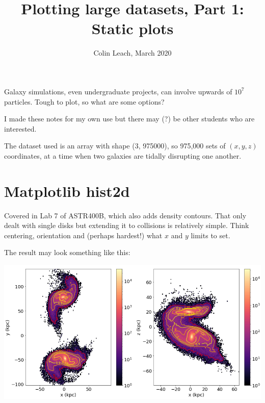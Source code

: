 

\setlength{\parskip}{0.2em}
\setlength{\skip\footins}{20pt}

\title{Plotting large datasets, Part 1: Static plots}
\author{Colin Leach, March 2020}
\date{\vspace{-3ex}}



	
\maketitle

Galaxy simulations, even undergraduate projects, can involve upwards of $10^7$ particles. Tough to plot, so what are some options?

I made these notes for my own use but there may (?) be other students who are interested.

The dataset used is an array with shape (3, 975000), so 975,000 sets of $(x,y,z)$ coordinates, at a time when two galaxies are tidally disrupting one another.

\section{Matplotlib hist2d}

Covered in Lab 7 of ASTR400B, which also adds density contours. That only dealt with single disks but extending it to collisions is relatively simple. Think centering, orientation and (perhaps hardest!) what $x$ and $y$ limits to set.

The result may look something like this:

{\centering \includegraphics[scale=0.5]{mpl contours, 400b code} \par}

